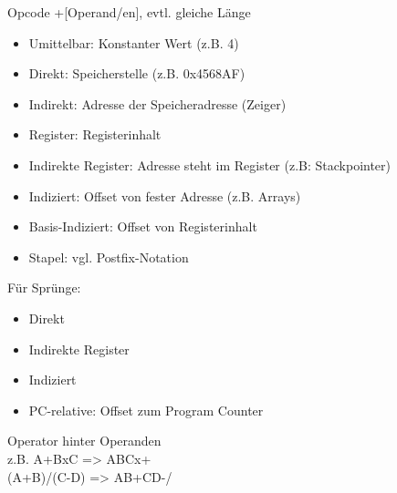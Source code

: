 Opcode +[Operand/en], evtl. gleiche Länge

\begin{itemize}
\item Umittelbar: Konstanter Wert (z.B. 4)
\item Direkt: Speicherstelle (z.B. 0x4568AF)
\item Indirekt: Adresse der Speicheradresse (Zeiger)
\item Register: Registerinhalt
\item Indirekte Register: Adresse steht im Register (z.B: Stackpointer)
\item Indiziert: Offset von fester Adresse (z.B. Arrays)
\item Basis-Indiziert: Offset von Registerinhalt
\item Stapel: vgl. Postfix-Notation
\end{itemize}

Für Sprünge:
\begin{itemize}
\item Direkt
\item Indirekte Register
\item Indiziert 
\item PC-relative: Offset zum Program Counter
\end{itemize}



 Operator hinter Operanden \\
z.B. A+BxC => ABCx+\\
(A+B)/(C-D) => AB+CD-/


